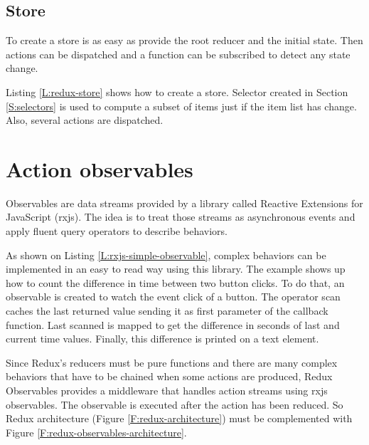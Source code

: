 \subsection{Store}

To create a store is as easy as provide the root reducer and the initial state.
Then actions can be dispatched and a function can be subscribed to detect any
state change.

Listing \ref{L:redux-store} shows how to create a store. Selector created in
Section \ref{S:selectors} is used to compute a subset of items just if the
item list has change. Also, several actions are dispatched.

\begin{codefigure}
\end{codefigure}

\section{Action observables}

Observables are data streams provided by a library called Reactive Extensions
for JavaScript (rxjs). The idea is to treat those streams as asynchronous 
events and apply fluent query operators to describe behaviors.

\begin{codefigure}
\end{codefigure}

As shown on Listing \ref{L:rxjs-simple-observable}, complex behaviors can be
implemented in an easy to read way using this library. The example shows up
how to count the difference in time between two button clicks. To do that, 
an observable is created to watch the event click of a button. The operator scan
caches the last returned value sending it as first parameter of the callback
function. Last scanned is mapped to get the difference in seconds of last
and current time values. Finally, this difference is printed on a text element.

Since Redux's reducers must be pure functions and there are many complex
behaviors that have to be chained when some actions are produced, Redux
Observables provides a middleware that handles action streams using rxjs
observables. The observable is executed after the action has been reduced.
So Redux architecture (Figure \ref{F:redux-architecture}) must be complemented 
with Figure \ref{F:redux-observables-architecture}.

